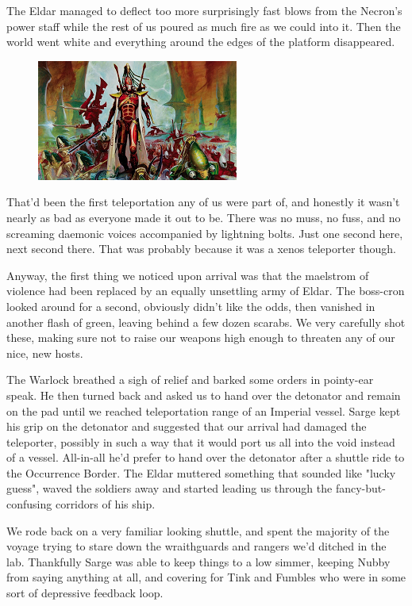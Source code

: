 The Eldar managed to deflect too more surprisingly fast blows from the Necron's power staff while the rest of us poured as much fire as we could into it. 
Then the world went white and everything around the edges of the platform disappeared.

\begin{figure}
	\begin{center}
		\includegraphics[width=\figwidth]{pics/11/91.png}
	\end{center}
\end{figure}
That'd been the first teleportation any of us were part of, and honestly it wasn't nearly as bad as everyone made it out to be. 
There was no muss, no fuss, and no screaming daemonic voices accompanied by lightning bolts. 
Just one second here, next second there. 
That was probably because it was a xenos teleporter though.

Anyway, the first thing we noticed upon arrival was that the maelstrom of violence had been replaced by an equally unsettling army of Eldar. 
The boss-cron looked around for a second, obviously didn't like the odds, then vanished in another flash of green, leaving behind a few dozen scarabs. 
We very carefully shot these, making sure not to raise our weapons high enough to threaten any of our nice, new hosts.

The Warlock breathed a sigh of relief and barked some orders in pointy-ear speak. 
He then turned back and asked us to hand over the detonator and remain on the pad until we reached teleportation range of an Imperial vessel. 
Sarge kept his grip on the detonator and suggested that our arrival had damaged the teleporter, possibly in such a way that it would port us all into the void instead of a vessel. 
All-in-all he'd prefer to hand over the detonator after a shuttle ride to the Occurrence Border. 
The Eldar muttered something that sounded like "lucky guess", waved the soldiers away and started leading us through the fancy-but-confusing corridors of his ship.

We rode back on a very familiar looking shuttle, and spent the majority of the voyage trying to stare down the wraithguards and rangers we'd ditched in the lab. 
Thankfully Sarge was able to keep things to a low simmer, keeping Nubby from saying anything at all, and covering for Tink and Fumbles who were in some sort of depressive feedback loop.

